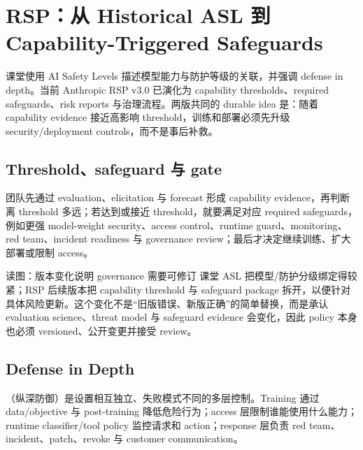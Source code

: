 \section{RSP：从 Historical ASL 到 Capability-Triggered Safeguards}

课堂使用 AI Safety Levels 描述模型能力与防护等级的关联，并强调 defense in depth。当前 Anthropic RSP v3.0 已演化为 capability thresholds、required safeguards、risk reports 与治理流程。两版共同的 durable idea 是：随着 capability evidence 接近高影响 threshold，训练和部署必须先升级 security/deployment controls，而不是事后补救。

\subsection{Threshold、safeguard 与 gate}

团队先通过 evaluation、elicitation 与 forecast 形成 capability evidence，再判断离 threshold 多远；若达到或接近 threshold，就要满足对应 required safeguards，例如更强 model-weight security、access control、runtime guard、monitoring、red team、incident readiness 与 governance review；最后才决定继续训练、扩大部署或限制 access。


\begin{knowledgebox}{读图：版本变化说明 governance 需要可修订}
课堂 ASL 把模型/防护分级绑定得较紧；RSP 后续版本把 capability threshold 与 safeguard package 拆开，以便针对具体风险更新。这个变化不是“旧版错误、新版正确”的简单替换，而是承认 evaluation science、threat model 与 safeguard evidence 会变化，因此 policy 本身也必须 versioned、公开变更并接受 review。
\end{knowledgebox}


\subsection{Defense in Depth}

（纵深防御）是设置相互独立、失败模式不同的多层控制。Training 通过 data/objective 与 post-training 降低危险行为；access 层限制谁能使用什么能力；runtime classifier/tool policy 监控请求和 action；response 层负责 red team、incident、patch、revoke 与 customer communication。

